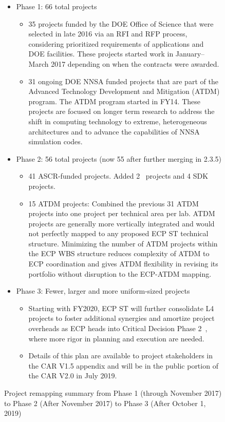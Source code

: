 \begin{figure}
\begin{mdframed}
\begin{itemize}
\item Phase 1: 66 total projects
\begin{itemize}
\item 35 projects funded by the DOE Office of Science that were selected in late 2016 via an RFI and RFP process, considering prioritized requirements of applications and DOE facilities. 
These projects started work in January–March 2017 depending on when the contracts were awarded.
\item 31 ongoing DOE NNSA funded projects that are part of the Advanced Technology Development and Mitigation (ATDM) program. The ATDM program started in FY14.  These projects are focused on longer term research to address the shift in computing technology to extreme, heterogeneous architectures and to advance the capabilities of NNSA simulation codes.
\end{itemize}
\item Phase 2: 56 total projects
(now 55 after further merging in 2.3.5)
\begin{itemize}
\item 41 ASCR-funded projects.  Added  2 \ecosystem\ projects and 4 SDK projects.
\item 15 ATDM projects: Combined the previous 31 ATDM projects into one project per technical area per lab.  ATDM projects are generally more vertically integrated and would not perfectly mapped to any proposed ECP ST technical structure.  Minimizing the number of ATDM projects within the ECP WBS structure reduces complexity of ATDM to ECP coordination and gives ATDM flexibility in revising its portfolio without disruption to the ECP-ATDM mapping.
\end{itemize}
\item Phase 3: Fewer, larger and more uniform-sized projects
\begin{itemize}
	\item Starting with FY2020, ECP ST will further consolidate L4 projects to foster additional synergies and amortize project overheads as ECP heads into Critical Decision Phase 2~\cite{413.3B}, where more rigor in planning and execution are needed.
	\item Details of this plan are available to project stakeholders in the CAR V1.5 appendix and will be in the public portion of the CAR V2.0 in July 2019.
\end{itemize}
\end{itemize}
\end{mdframed}

\caption{\label{fig:project-remapping}Project remapping summary from Phase 1 (through November 2017) to Phase 2 (After November 2017) to Phase 3 (After October 1, 2019)}
\end{figure}


